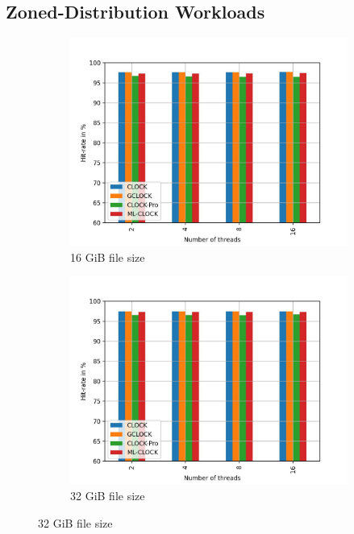 \documentclass[
	12pt,
	a4paper,
	abstract,
	bibliography=totoc,
	chapterprefix,
	headings=openright,
	numbers=endperiod,
	parskip=half,
	twoside,
]{scrreprt}
\begin{document}
\subsection{Zoned-Distribution Workloads}
\begin{figure}[H]
	\centering
	\begin{subfigure}{0.4\textwidth}
		\includegraphics[width=\textwidth]{multi_16_gb_randread_zoned.jpg}		
		\caption{16 GiB file size}
		\label{fig:rw_90to10  zipf}
	\end{subfigure}
	\hfill
	\begin{subfigure}{0.4\textwidth}
		\includegraphics[width=\textwidth]{multi_32_gb_randread_zoned.jpg}		
		\caption{32 GiB file size}
		\label{fig:rw_90to10  normal}

\end{subfigure}
\end{figure}
\end{document}
